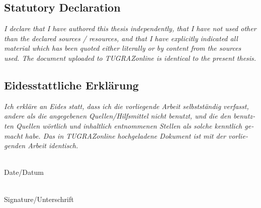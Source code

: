 
\cleardoublepage

\vspace*{2cm}







\subsection*{Statutory Declaration}
\noindent
\textit{
I declare that I have authored this thesis independently, that I have
not used other than the declared sources / resources, and that I have
explicitly indicated all material which has been quoted either
literally or by content from the sources used. The document uploaded
to TUGRAZonline is identical to the present thesis.}

\vspace{1cm}


\begin{otherlanguage}{austrian}

\subsection*{Eidesstattliche Erklärung}
\noindent
\textit{
Ich erkläre an Eides statt, dass ich die vorliegende Arbeit
selbstständig verfasst, andere als die angegebenen Quellen/Hilfsmittel
nicht benutzt, und die den benutzten Quellen wörtlich und inhaltlich
entnommenen Stellen als solche kenntlich gemacht habe. Das in
TUGRAZonline hochgeladene Dokument ist mit der vorliegenden
Arbeit identisch.}

\vspace{2cm}

\noindent
\parbox[top]{4cm}{
\begin{center}
\underline{\hspace*{4cm}} \\
Date/Datum
\end{center}
}
%
\hfill
%
\parbox[top]{6cm}{
\begin{center}
\underline{\hspace*{6cm}} \\
Signature/Unterschrift
\end{center}
} 

\end{otherlanguage}




